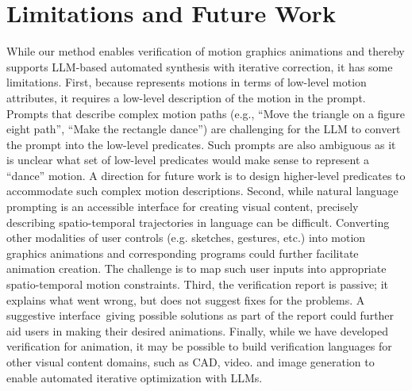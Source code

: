 \section{Limitations and Future Work}
\label{sec:limitations}

While our method enables verification of motion graphics animations
and thereby supports LLM-based automated synthesis with iterative
correction, it has some limitations.
%
First, because \dslname{} represents motions in terms of low-level
motion attributes, it requires a low-level description of the motion
in the prompt. Prompts that describe complex motion paths (e.g.,
``Move the triangle on a figure eight path'', ``Make the rectangle
dance'') are challenging for the LLM to convert the prompt into the
low-level \dslname{} predicates.  Such prompts are also ambiguous as
it is unclear what set of low-level predicates would make sense to
represent a ``dance'' motion.
%
A direction for future work is to design higher-level predicates to
accommodate such complex motion descriptions.
%
Second, while natural language prompting is an accessible interface for
creating visual content, precisely describing spatio-temporal
trajectories in language can be difficult. Converting other modalities
of user controls (e.g. sketches, gestures, etc.) into motion graphics
animations and corresponding \dslname{} programs could further
facilitate animation creation. The challenge is to map such user
inputs into appropriate spatio-temporal motion constraints.
%
Third, the \dslname{} verification report is passive; it explains
what went wrong, but does not suggest fixes for the
problems. A suggestive interface\,\cite{igarashi2001} giving possible solutions
as part of the report could
further aid users in making their desired animations.
%
Finally, while we have developed verification for animation, it may be
possible to build verification languages for other visual content
domains, such as CAD, video. and image generation to
enable automated iterative optimization with LLMs.




